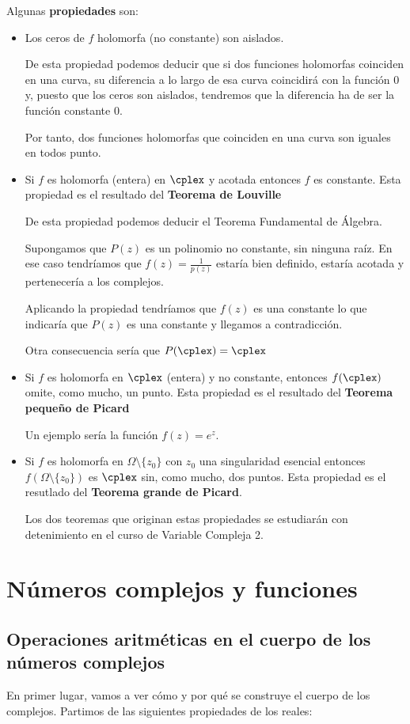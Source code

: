 \documentclass{apuntes}
\begin{document}
Algunas \textbf{propiedades} son:
\begin{itemize}
\item Los ceros de $f$ holomorfa (no constante) son aislados.

De esta propiedad podemos deducir que si dos funciones holomorfas coinciden en una curva, su diferencia a lo largo de esa curva coincidirá con la función 0 y, puesto que los ceros son aislados, tendremos que la diferencia ha de ser la función constante 0.

Por tanto, dos funciones holomorfas que coinciden en una curva son iguales en todos punto.

\item Si $f$ es holomorfa (entera) en $\cplex$ y acotada entonces $f$ es constante. Esta propiedad es el resultado del \textbf{Teorema de Louville}

De esta propiedad podemos deducir el Teorema Fundamental de Álgebra.

Supongamos que $P(z)$ es un polinomio no constante, sin ninguna raíz. En ese caso tendríamos que $f(z)=\frac{1}{p(z)}$ estaría bien definido, estaría acotada y pertenecería a los complejos.

Aplicando la propiedad tendríamos que $f(z)$ es una constante lo que indicaría que $P(z)$ es una constante y llegamos a contradicción.

Otra consecuencia sería que $P(\cplex)=\cplex$

\item Si $f$ es holomorfa en $\cplex$  (entera) y no constante, entonces $f(\cplex)$ omite, como mucho, un punto. Esta propiedad es el resultado del \textbf{Teorema pequeño de Picard}

Un ejemplo sería la función $f(z)=e^z$.

\item Si $f$ es holomorfa en $\Omega\setminus \{z_0\}$ con $z_0$ una singularidad esencial entonces $f(\Omega\setminus \{z_0\})$ es $\cplex$ sin, como mucho, dos puntos. Esta propiedad es el resutlado del \textbf{Teorema grande de Picard}.

Los dos teoremas que originan estas propiedades se estudiarán con detenimiento en el curso de Variable Compleja 2.
\end{itemize}

\chapter{Números complejos y funciones}
\section{Operaciones aritméticas en el cuerpo de los números complejos}
En primer lugar, vamos a ver cómo y por qué se construye el cuerpo de los complejos.
Partimos de las siguientes propiedades de los reales:
\end{document}
